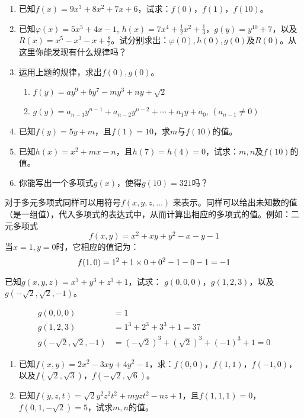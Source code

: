 \begin{ex}
    \begin{enumerate}
        \item 已知$f(x)=9x^3+8x^2+7x+6$，试求：$f(0)$，$f(1)$，$f(10)$。
        \item 已知$\varphi(x)=5x^5+4x-1$, $h(x)=7x^4+\frac{1}{2}x^2+\frac{1}{3}$，$g(y)=y^{10}+7$，以及$R(x)=x^5-x^3-x+\frac{8}{7}$。试分别求出：$\varphi(0), h(0), g(0)$及$R(0)$。从这里你能发现有什么规律吗？
        \item 运用上题的规律，求出$f(0),g(0)$。
        \begin{enumerate}
            \item $f(y)=ay^9+by^7-my^3+ny+\sqrt{2}$
            \item $g(y)=a_{n-1}y^{n-1}+a_{n-2}y^{n-2}+\cdots+a_1 y+a_0$, $(a_{n-1}\ne 0)$
        \end{enumerate}
        \item 已知$f(y)=5y+m$，且$f(1)=10$，求$m$与$f(10)$的值。
        \item 已知$h(x)=x^2+mx-n$，且$h(7)=h(4)=0$，试求：$m,n$及$f(10)$的值。
        \item 你能写出一个多项式$g(x)$，使得$g(10)=321$吗？
    \end{enumerate}
\end{ex}

对于多元多项式同样可以用符号$f(x,y,z,\ldots)$
来表示。同样可以给出未知数的值（是一组值），代入多项式的表达式中，从而计算出相应的多项式的值。例如：二元多项式$$f(x,y)=x^2+xy+y^2-x-y-1  $$
当$x=1,y=0$时，它相应的值记为：
$$f (1, 0) =1^2+1\times0+0^2-1-0-1=-1$$

\begin{example}
    已知$g(x,y,z)=x^3+y^3+z^3+1$，试求：
$g(0,0,0)$，$g(1,2,3)$，以及$g\left(-\sqrt{2},\sqrt{2},-1\right)$。
\end{example}

\begin{solution}
    \[\begin{split}
        g(0,0,0)&=1\\
        g(1,2,3)&=1^3+2^3+3^3+1=37\\
        g\left(-\sqrt{2},\sqrt{2},-1\right)&=\left(-\sqrt{2}\right)^3+\left(\sqrt{2}\right)^3+(-1)^3+1=0
    \end{split}\]
\end{solution}

\begin{ex}
    \begin{enumerate}
        \item 已知$f(x,y)=2x^2-3xy+4y^2-1$，求：$f(0,0)$，$f(1,1)$，$f(-1,0)$，以及$f(\sqrt{2},\sqrt{3})$，$f(-\sqrt{2},\sqrt{6})$。
        \item 已知$f(y,z,t)=\sqrt{2}y^2z^2t^2+myzt^2-nz+1$，且$f(1,1,1)=0$，$f(0,1,-\sqrt{2})=5$，试求$m,n$的值。
    \end{enumerate}
\end{ex}


